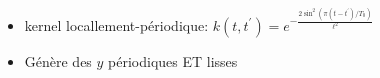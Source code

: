 \documentclass[xcolor=svgnames, t]{beamer}
\begin{document}
\begin{frame}{\subsecname}  
  \begin{itemize}
    \item<1-> kernel locallement-périodique:
    $k (t, t^\prime) = e^{- \frac{2 \sin^2(\pi (t - t^\prime) / T_0)}{\ell^2}}$
    \item<1-> Génère des $y$ périodiques ET lisses
  \end{itemize}
  \begin{figure}
  \end{figure}
\end{frame}
\end{document}
